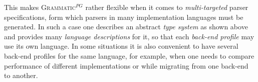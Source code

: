 \documentclass{informat} %
\newcommand{\ATF}{\textsc{Grammatic}$^{PG}$}
\begin{document}
This makes \ATF{} rather flexible when it comes to \emph{multi-targeted} parser specifications, form which parsers in many implementation languages must be generated. 
In such a case one describes an abstract \emph{type system} as shown above and provides many \emph{language descriptions} for it, so that each \emph{back-end profile} may use its own language. In some situations it is also convenient to have several back-end profiles for the same language, for example, when one needs to compare performance of different implementations or while migrating from one back-end to another.

\end{document}
